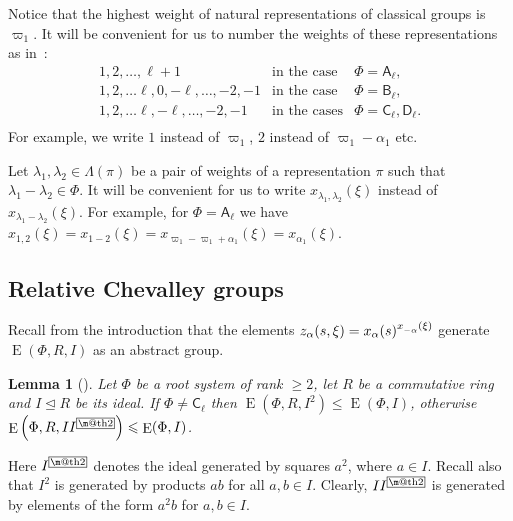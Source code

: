 \documentclass[12pt]{amsart}
\makeatletter
\theoremstyle{plain}
\numberwithin{equation}{section}
\newtheorem{lemma}{Lemma}
\numberwithin{lemma}{section}
\theoremstyle{definition}
\theoremstyle{remark}
\newtheorem{rem}[lemma]{Remark}
\DeclareMathOperator{\SO}{SO}
\DeclareMathOperator{\E}{E}
\newcommand{\rA}{\mathsf{A}}
\newcommand{\rB}{\mathsf{B}}
\newcommand{\rC}{\mathsf{C}}
\newcommand{\rD}{\mathsf{D}}
\newcommand{\indexbox}[1]{\text{\fboxsep=.1em\fbox{\m@th$\displaystyle#1$}}}
\def\ssub#1{\mathchoice
   {_{\lower2pt\hbox{$\scriptstyle #1$}}}
   {_{\lower2pt\hbox{$\scriptstyle #1$}}}
   {_{\lower1.5pt\hbox{$\scriptscriptstyle #1$}}}
   {_{\!\lower1.5pt\hbox{$\scriptscriptstyle #1$}}}}
\makeatother
\begin{document}
Notice that the highest weight of natural representations of classical groups is $\varpi_1$.
It will be convenient for us to number the weights of these representations as in~\cite[\S~1B]{St78}:
\[\begin{array}{cll}
  1, 2, \ldots, \ell+1 & \text{in the case} & \Phi =\rA_\ell, \\
  1, 2, \ldots \ell, 0, -\ell, \ldots, -2, -1 & \text{in the case} & \Phi =\rB_\ell, \\
  1, 2, \ldots \ell, -\ell, \ldots, -2, -1 & \text{in the cases}   & \Phi =\rC_\ell, \rD_\ell. \\
\end{array}\]
For example, we write $1$ instead of $\varpi_1$, $2$ instead of $\varpi_1-\alpha_1$ etc.

Let $\lambda_1, \lambda_2 \in \Lambda(\pi)$ be a pair of weights of a representation $\pi$ such that $\lambda_1-\lambda_2\in \Phi$.
It will be convenient for us to write $x_{\lambda_1, \lambda_2}(\xi)$ instead of $x_{\lambda_1-\lambda_2}(\xi)$.
For example, for $\Phi=\rA_\ell$ we have $x_{1, 2}(\xi)=x_{1-2}(\xi)=x_{\varpi_1 - \varpi_1 + \alpha_1}(\xi) = x_{\alpha_1}(\xi)$.


\subsection{Relative Chevalley groups}\label{sec:relative-elementary}
Recall from the introduction that the elements $z_\alpha(s, \xi) = x_\alpha(s)^{x\ssub{-\alpha}(\xi)}$ generate $\E(\Phi, R, I)$ as an abstract group.

\begin{lemma}[{\cite[Corollary~3.3]{S}}]\label{lemma:Stepanov-ideal}
Let $\Phi$ be a root system of rank $\geqslant2$, let $R$ be a commutative ring and $I\trianglelefteq R$ be its ideal.
If $\Phi\neq\rC_\ell$ then $\E\left(\Phi, R, I^2\right)\leqslant\E(\Phi, I)$, otherwise $\E\left(\Phi, R, II^{\indexbox{2}}\right)\leqslant\E(\Phi, I)$.
\end{lemma}
Here $I^{\indexbox{2}}$ denotes the ideal generated by squares $a^2$, where $a\in I$.
Recall also that $I^2$ is generated by products $ab$ for all $a, b\in I$.
Clearly, $II^{\indexbox{2}}$ is generated by elements of the form $a^2b$ for $a, b\in I$.
\end{document}
